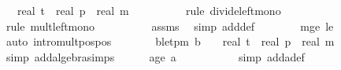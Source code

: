\begin{isabellebody}
\ {\isachardoublequoteopen}{\isachardot}{\kern0pt}{\isachardot}{\kern0pt}{\isachardot}{\kern0pt}\ {\isasymle}\ real\ t\ {\isacharasterisk}{\kern0pt}\ real\ p\ {\isacharslash}{\kern0pt}\ {\isacharparenleft}{\kern0pt}real\ m\ {\isacharasterisk}{\kern0pt}\ {\isacharparenleft}{\kern0pt}{}{\isacharslash}{\kern0pt}{}{\isacharparenright}{\kern0pt}{\isacharparenright}{\kern0pt}{\isachardoublequoteclose}\isanewline
\ \ \ \ \ \ \isamarkupfalse%
\ {\isacharparenleft}{\kern0pt}rule\ divide{\isacharunderscore}{\kern0pt}left{\isacharunderscore}{\kern0pt}mono{\isacharparenright}{\kern0pt}\isanewline
\ \ \ \ \ \ \ \ \isamarkupfalse%
\ {\isacharparenleft}{\kern0pt}rule\ mult{\isacharunderscore}{\kern0pt}left{\isacharunderscore}{\kern0pt}mono{\isacharparenright}{\kern0pt}\isanewline
\ \ \ \ \ \ \ \ \isamarkupfalse%
\ assms\ \isamarkupfalse%
\ {\isacharparenleft}{\kern0pt}simp\ add{\isacharcolon}{\kern0pt}{\isasymdelta}{\isacharprime}{\kern0pt}{\isacharunderscore}{\kern0pt}def{\isacharparenright}{\kern0pt}\isanewline
\ \ \ \ \ \ \isamarkupfalse%
\ m{\isacharunderscore}{\kern0pt}ge{\isacharunderscore}{\kern0pt}{}\ {\isasymdelta}{\isacharprime}{\kern0pt}{\isacharunderscore}{\kern0pt}le{\isacharunderscore}{\kern0pt}{}\ \isamarkupfalse%
\ {\isacharparenleft}{\kern0pt}auto\ intro{\isacharbang}{\kern0pt}{\isacharcolon}{\kern0pt}mult{\isacharunderscore}{\kern0pt}pos{\isacharunderscore}{\kern0pt}pos{\isacharparenright}{\kern0pt}\isanewline
\ \ \ \ \isamarkupfalse%
\ \isamarkupfalse%
\ b{\isacharunderscore}{\kern0pt}le{\isacharunderscore}{\kern0pt}tpm{\isacharcolon}{\kern0pt}\ {\isachardoublequoteopen}b\ {\isasymle}\ {}\ {\isacharasterisk}{\kern0pt}\ real\ t\ {\isacharasterisk}{\kern0pt}\ real\ p\ {\isacharslash}{\kern0pt}\ real\ m{\isachardoublequoteclose}\isanewline
\ \ \ \ \ \ \isamarkupfalse%
\ {\isacharparenleft}{\kern0pt}simp\ add{\isacharcolon}{\kern0pt}algebra{\isacharunderscore}{\kern0pt}simps{\isacharparenright}{\kern0pt}\isanewline
\isanewline
\ \ \ \ \isamarkupfalse%
\ a{\isacharunderscore}{\kern0pt}ge{\isacharunderscore}{\kern0pt}{}{\isacharcolon}{\kern0pt}\ {\isachardoublequoteopen}a\ {\isasymge}\ {}{\isachardoublequoteclose}\ \isanewline
\ \ \ \ \ \ \isamarkupfalse%
\ {\isacharparenleft}{\kern0pt}simp\ add{\isacharcolon}{\kern0pt}a{\isacharunderscore}{\kern0pt}def{\isacharparenright}{\kern0pt}\isanewline

\end{isabellebody}
